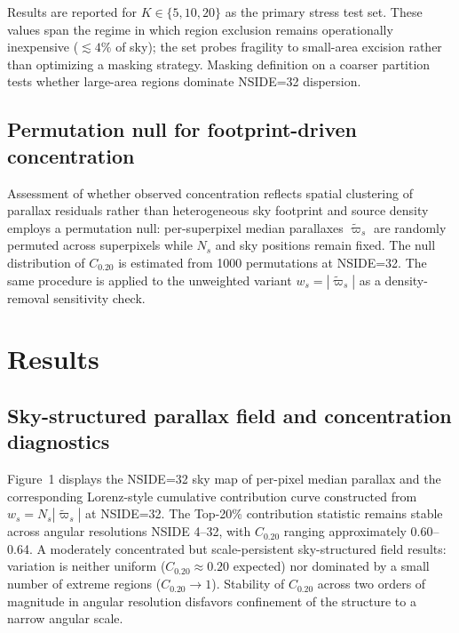 \documentclass{aa}
\begin{document}
Results are reported for $K \in \{5,10,20\}$ as the primary stress test set. These values span the regime in which region exclusion remains operationally inexpensive ($\lesssim 4\%$ of sky); the set probes fragility to small-area excision rather than optimizing a masking strategy. Masking definition on a coarser partition tests whether large-area regions dominate NSIDE=32 dispersion.

\subsection{Permutation null for footprint-driven concentration}
Assessment of whether observed concentration reflects spatial clustering of parallax residuals rather than heterogeneous sky footprint and source density employs a permutation null: per-superpixel median parallaxes $\tilde{\varpi}_s$ are randomly permuted across superpixels while $N_s$ and sky positions remain fixed. The null distribution of $C_{0.20}$ is estimated from 1000 permutations at NSIDE=32. The same procedure is applied to the unweighted variant $w_s = |\tilde{\varpi}_s|$ as a density-removal sensitivity check.

\section{Results}

\subsection{Sky-structured parallax field and concentration diagnostics}
Figure~1 displays the NSIDE=32 sky map of per-pixel median parallax and the corresponding Lorenz-style cumulative contribution curve constructed from $w_s = N_s |\tilde{\varpi}_s|$ at NSIDE=32. The Top-20\% contribution statistic remains stable across angular resolutions NSIDE 4--32, with $C_{0.20}$ ranging approximately 0.60--0.64. A moderately concentrated but scale-persistent sky-structured field results: variation is neither uniform ($C_{0.20} \approx 0.20$ expected) nor dominated by a small number of extreme regions ($C_{0.20} \rightarrow 1$). Stability of $C_{0.20}$ across two orders of magnitude in angular resolution disfavors confinement of the structure to a narrow angular scale.
\end{document}
